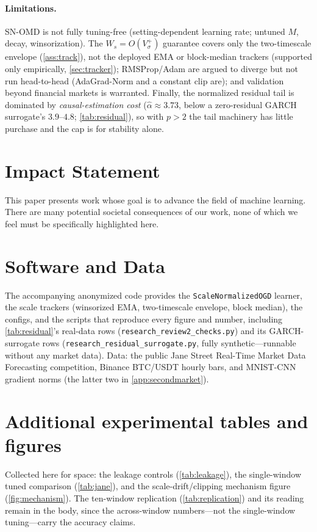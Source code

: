 \documentclass{article}
\begin{document}
\paragraph{Limitations.} SN-OMD is not fully tuning-free (setting-dependent learning rate;
untuned $M$, decay, winsorization).
The $W_s=O(V_\sigma^+)$ guarantee
covers only the two-timescale envelope (\cref{ass:track}), not the deployed EMA or block-median
trackers (supported only empirically, \cref{sec:tracker}); RMSProp/Adam are argued to diverge
but not run head-to-head (AdaGrad-Norm and a constant clip are); and validation beyond financial
markets is warranted. Finally, the normalized residual tail is dominated by
\emph{causal-estimation cost} ($\hat\alpha\approx3.73$, below a zero-residual GARCH
surrogate's $3.9$--$4.8$; \cref{tab:residual}), so with $p>2$ the tail machinery has
little purchase and the cap is for stability alone.

\section*{Impact Statement}
This paper presents work whose goal is to advance the field of machine learning. There
are many potential societal consequences of our work, none of which we feel must be
specifically highlighted here.




\newpage
\appendix
\onecolumn

\section*{Software and Data}
The accompanying anonymized code provides the \texttt{ScaleNormalizedOGD} learner, the scale trackers
(winsorized EMA, two-timescale envelope, block median), the configs, and the scripts that
reproduce every figure and number, including \cref{tab:residual}'s real-data rows
(\texttt{research\_review2\_checks.py}) and its GARCH-surrogate rows
(\texttt{research\_residual\_surrogate.py}, fully synthetic---runnable without any market data).
Data: the public Jane Street Real-Time Market Data Forecasting competition, Binance BTC/USDT
hourly bars, and MNIST-CNN gradient norms (the latter two in \cref{app:secondmarket}).

\section{Additional experimental tables and figures}
\label{app:tables}
Collected here for space: the leakage controls (\cref{tab:leakage}), the single-window tuned
comparison (\cref{tab:jane}), and the scale-drift/clipping mechanism figure
(\cref{fig:mechanism}). The ten-window replication (\cref{tab:replication}) and its reading
remain in the body, since the across-window numbers---not the single-window tuning---carry the
accuracy claims.
\end{document}
